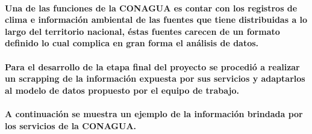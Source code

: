 \paragraph{Una de las funciones de la CONAGUA es contar con los registros de clima e información ambiental de las fuentes que tiene distribuidas a lo largo del territorio nacional, éstas fuentes carecen de un formato definido lo cual complica en gran forma el análisis de datos.\cite{32}}
\paragraph{Para el desarrollo de la etapa final del proyecto se procedió a realizar un scrapping de la información expuesta por sus servicios y adaptarlos al modelo de datos propuesto por el equipo de trabajo.}
\paragraph{A continuación se muestra un ejemplo de la información brindada por los servicios de la CONAGUA.}
 
